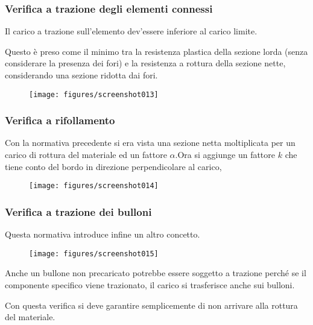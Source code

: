 \documentclass[a4paper, 15pt]{article}
\begin{document}
\subsubsection{Verifica a trazione degli elementi connessi}
\begin{adjustwidth}{2in}{}	 
	Il carico a trazione sull'elemento dev'essere inferiore al carico limite.
	
	Questo è preso come il minimo tra la resistenza plastica della sezione lorda (senza considerare la presenza dei fori) e la resistenza  a rottura della sezione nette, considerando una sezione ridotta dai fori. 
	\begin{figure}[H]
		\centering
		\texttt{[image: figures/screenshot013]}
		\label{fig:screenshot013}
	\end{figure}
\end{adjustwidth}
\subsubsection{Verifica a rifollamento}
\begin{adjustwidth}{2in}{}	
	Con la normativa precedente si era vista una sezione netta moltiplicata per un carico di rottura del materiale ed un fattore $\alpha$.Ora si aggiunge un fattore $k$ che tiene conto del bordo in direzione perpendicolare al carico, 	
	 \begin{figure}[H]
	 	\centering
	 	\texttt{[image: figures/screenshot014]}
	 	\label{fig:screenshot014}
	 \end{figure}
\end{adjustwidth}
\newpage
\subsubsection{Verifica a trazione dei bulloni}
\begin{adjustwidth}{2in}{}		 
	Questa normativa introduce infine un altro concetto. 
	\begin{figure}[H]
		\centering
		\texttt{[image: figures/screenshot015]}
		\label{fig:screenshot015}
	\end{figure}	
	Anche un bullone non precaricato potrebbe essere soggetto a trazione perché se il componente specifico viene trazionato, il carico si trasferisce anche sui bulloni. 
	
	Con questa verifica si deve garantire semplicemente di non arrivare alla rottura del materiale. 
\end{adjustwidth}
\end{document}
